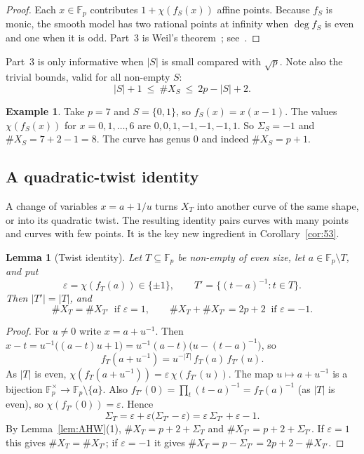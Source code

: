 \documentclass[12pt,letterpaper]{article}
\newtheorem{lemma}[theorem]{Lemma}
\theoremstyle{definition}
\newtheorem{example}[theorem]{Example}
\theoremstyle{remark}
\numberwithin{equation}{section}
\newcommand{\Fp}{\mathbb{F}_p}
\newcommand{\X}{\#X}
\begin{document}
\begin{proof}
Each $x\in\Fp$ contributes $1+\chi(f_S(x))$ affine points. Because $f_S$ is monic,
the smooth model has two rational points at infinity when $\deg f_S$ is even and one
when it is odd. Part~3 is Weil's theorem~\cite{We48}; see~\cite[\S2.11]{Sc04}.
\end{proof}

Part~3 is only informative when $|S|$ is small compared with $\sqrt p$. Note also the
trivial bounds, valid for all non-empty $S$:
\begin{equation}\label{eq:trivial}
|S|+1\ \le\ \X_S\ \le\ 2p-|S|+2 .
\end{equation}

\begin{example}\label{ex:p7points}
Take $p=7$ and $S=\{0,1\}$, so $f_S(x)=x(x-1)$. The values $\chi(f_S(x))$ for
$x=0,1,\dots,6$ are $0,0,1,-1,-1,-1,1$. So $\Sigma_S=-1$ and $\X_S=7+2-1=8$. The
curve has genus $0$ and indeed $\X_S=p+1$.
\end{example}

\subsection{A quadratic-twist identity}

A change of variables $x=a+1/u$ turns $X_T$ into another curve of the same shape,
or into its quadratic twist. The resulting identity pairs curves with many points
and curves with few points. It is the key new ingredient in
Corollary~\ref{cor:53}.

\begin{lemma}[Twist identity]\label{lem:twist}
Let $T\subseteq\Fp$ be non-empty of even size, let $a\in\Fp\setminus T$, and put
\[
\varepsilon=\chi(f_T(a))\in\{\pm1\},\qquad T'=\{(t-a)^{-1}: t\in T\}.
\]
Then $|T'|=|T|$, and
\[
\X_T=\X_{T'}\ \text{ if }\varepsilon=1,\qquad
\X_T+\X_{T'}=2p+2\ \text{ if }\varepsilon=-1 .
\]
\end{lemma}

\begin{proof}
For $u\ne0$ write $x=a+u^{-1}$. Then
$x-t=u^{-1}\big((a-t)u+1\big)=u^{-1}(a-t)\big(u-(t-a)^{-1}\big)$, so
\[
f_T(a+u^{-1})=u^{-|T|}\,f_T(a)\,f_{T'}(u).
\]
As $|T|$ is even, $\chi(f_T(a+u^{-1}))=\varepsilon\,\chi(f_{T'}(u))$. The map
$u\mapsto a+u^{-1}$ is a bijection $\Fp^\times\to\Fp\setminus\{a\}$. Also
$f_{T'}(0)=\prod_{t}(t-a)^{-1}=f_T(a)^{-1}$ (as $|T|$ is even), so
$\chi(f_{T'}(0))=\varepsilon$. Hence
\[
\Sigma_T=\varepsilon+\varepsilon\big(\Sigma_{T'}-\varepsilon\big)
=\varepsilon\,\Sigma_{T'}+\varepsilon-1 .
\]
By Lemma~\ref{lem:AHW}(1), $\X_T=p+2+\Sigma_T$ and $\X_{T'}=p+2+\Sigma_{T'}$.
If $\varepsilon=1$ this gives $\X_T=\X_{T'}$; if $\varepsilon=-1$ it gives
$\X_T=p-\Sigma_{T'}=2p+2-\X_{T'}$.
\end{proof}
\end{document}
